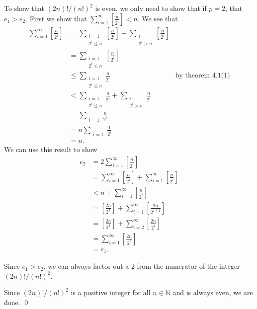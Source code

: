 \documentclass[12 pt]{amsart}
\begin{document}
  To show that $(2n)!/(n!)^2$ is even, we only need to show that if
  $p = 2$, that $e_1 > e_2$. 
  First we show that 
  $\sum_{i = 1}^{\infty} \left[ \frac{n}{2^i} \right] < n$.
  We see that 
  \begin{align*}
    \sum_{i = 1}^{\infty} \left[ \frac{n}{2^i} \right]
    &=
      \sum_{\substack{i = 1 \\ 2^i \leq n}} \left[ \frac{n}{2^i} \right]
    + \sum_{\substack{i \\ 2^i > n}} \left[ \frac{n}{2^i} \right] \\
    &=
      \sum_{\substack{i = 1 \\ 2^i \leq n}} \left[ \frac{n}{2^i} \right] \\
    &\leq
      \sum_{\substack{i = 1\\ 2^i \leq n}} \frac{n}{2^i}
      & \text{by theorem 4.1(1)}\\
    &< 
      \sum_{\substack{i = 1\\ 2^i \leq n}} \frac{n}{2^i}
      + \sum_{\substack{i \\ 2^i > n}} \frac{n}{2^i} \\
    &= 
      \sum_{\substack{i = 1}} \frac{n}{2^i} \\
    &= 
      n \sum_{\substack{i = 1}} \frac{1}{2^i} \\ 
    &= 
      n.
  \end{align*}
  We can use this result to show
  \begin{align*}
    e_2  &=  2 \sum_{i = 1}^{\infty} \left[ \frac{n}{2^i} \right] \\
         &=  \sum_{i = 1}^{\infty} \left[ \frac{n}{2^i} \right] 
             + \sum_{i = 1}^{\infty} \left[ \frac{n}{2^i} \right] \\
         &<  n + \sum_{i = 1}^{\infty} \left[ \frac{n}{2^i} \right] \\
         &=  \left[ \frac{2n}{2^1} \right] 
            + \sum_{i = 1}^{\infty} \left[ \frac{2n}{2^{i+1}} \right] \\
         &=  \left[ \frac{2n}{2^1} \right] 
            + \sum_{i = 2}^{\infty} \left[ \frac{2n}{2^{i}} \right] \\
         &=  \sum_{i = 1}^{\infty} \left[ \frac{2n}{2^{i}} \right] \\ 
         &= e_1.
  \end{align*}

  Since $e_1 > e_2$, we can always factor out a 2 from the numerator 
  of the integer $(2n)!/(n!)^2$. 
  
  Since $(2n)!/(n!)^2$ is a positive integer for all $n \in \mathbb{N}$
  and is always even, we are done.
  \qed
\vfill
\newpage
\end{document}
